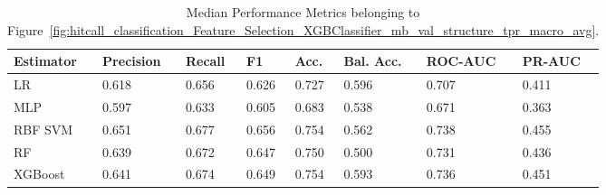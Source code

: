 \begin{longtable}{llllllll}
\caption{Median Performance Metrics belonging to Figure~\ref{fig:hitcall_classification_Feature_Selection_XGBClassifier_mb_val_structure_tpr_macro_avg}.}\label{tab:table:hitcall_classification_feature_selection_xgbclassifier_mb_val_structure_tpr_macro_avg}\\
\toprule
\midrule
\small Estimator & \small Precision & \small Recall & \small F1 & \small Acc. & \small Bal. Acc. & \small ROC-AUC & \small PR-AUC\\
\hline
LR & 0.618 & 0.656 & 0.626 & 0.727 & 0.596 & 0.707 & 0.411\\
MLP & 0.597 & 0.633 & 0.605 & 0.683 & 0.538 & 0.671 & 0.363\\
RBF SVM & 0.651 & 0.677 & 0.656 & 0.754 & 0.562 & 0.738 & 0.455\\
RF & 0.639 & 0.672 & 0.647 & 0.750 & 0.500 & 0.731 & 0.436\\
XGBoost & 0.641 & 0.674 & 0.649 & 0.754 & 0.593 & 0.736 & 0.451\\
\bottomrule
\end{longtable}
